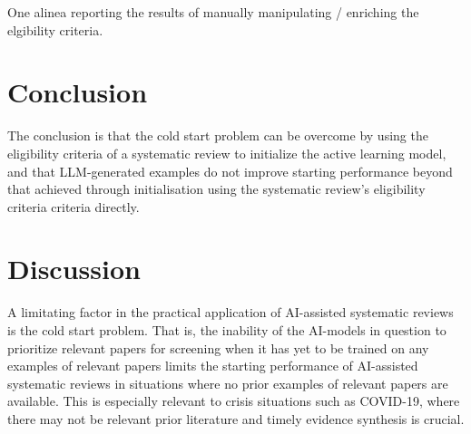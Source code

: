 \documentclass[12pt]{article}
\begin{document}
One alinea reporting the results of manually manipulating / enriching the elgibility criteria.

\section{Conclusion} 

The conclusion is that the cold start problem can be overcome by using the eligibility criteria of a systematic review to initialize the active learning model, and that LLM-generated examples do not improve starting performance beyond that achieved through initialisation using the systematic review's eligibility criteria criteria directly.


\section{Discussion}

A limitating factor in the practical application of AI-assisted systematic reviews is the cold start problem. That is, the inability of the AI-models in question to prioritize relevant papers for screening when it has yet to be trained on any examples of relevant papers limits the starting performance of AI-assisted systematic reviews in situations where no prior examples of relevant papers are available. This is especially relevant to crisis situations such as COVID-19, where there may not be relevant prior literature and timely evidence synthesis is crucial.
\end{document}
